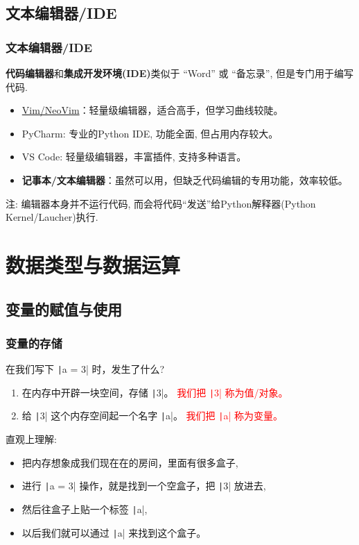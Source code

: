 \documentclass{ctexbeamer}
\begin{document}
        \subsection{文本编辑器/IDE}
        \begin{frame}
            \frametitle{文本编辑器/IDE}
            \textbf{代码编辑器}和\textbf{集成开发环境(IDE)}类似于 ``Word'' 或 ``备忘录'', 但是专门用于编写代码.
            \vspace{1em}
            \begin{itemize}
                \item \href{https://www.vim.org/download.php}{Vim/NeoVim}：轻量级编辑器，适合高手，但学习曲线较陡。
                \item PyCharm: 专业的Python IDE, 功能全面, 但占用内存较大。
                \item VS Code: 轻量级编辑器，丰富插件, 支持多种语言。
                \item \textbf{记事本/文本编辑器}：虽然可以用，但缺乏代码编辑的专用功能，效率较低。
            \end{itemize}
            \vspace{1em}\pause
            \begin{notice}
                注: 编辑器本身并不运行代码, 而会将代码``发送''给Python解释器(Python Kernel/Laucher)执行.
            \end{notice}
        \end{frame}

    \section{数据类型与数据运算}
    \subsection{变量的赋值与使用}
    \begin{frame}
        \frametitle{变量的存储}
        在我们写下 \texttt|a = 3| 时，发生了什么? \pause
        \begin{enumerate}
            \item 在内存中开辟一块空间，存储 \texttt|3|。 \textcolor{red}{我们把 \texttt|3| 称为值/对象。}
            \item 给 \texttt|3| 这个内存空间起一个名字 \texttt|a|。 \textcolor{red}{我们把 \texttt|a| 称为变量。}
        \end{enumerate}
        \pause\vspace{2em}
        直观上理解: 
        \begin{itemize}
            \item 把内存想象成我们现在在的房间，里面有很多盒子,
            \item 进行 \texttt|a = 3| 操作，就是找到一个空盒子，把 \texttt|3| 放进去,
            \item 然后往盒子上贴一个标签 \texttt|a|,
            \item 以后我们就可以通过 \texttt|a| 来找到这个盒子。
        \end{itemize}
    \end{frame}
\end{document}
